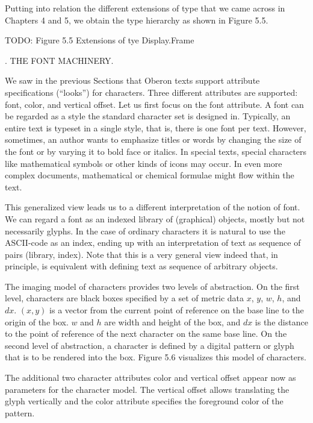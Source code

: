 Putting into relation the different extensions of type  that we came across in Chapters 4 and 5, we obtain the type hierarchy as shown in Figure 5.5.

TODO: Figure 5.5 Extensions of tye Display.Frame

. THE FONT MACHINERY.

We saw in the previous Sections that Oberon texts support attribute specifications (``looks'') for characters. Three different attributes are supported: font, color, and vertical offset. Let us first focus on the font attribute. A font can be regarded as a style the standard character set is designed in. Typically, an entire text is typeset in a single style, that is, there is one font per text. However, sometimes, an author wants to emphasize titles or words by changing the size of the font or by varying it to bold face or italics. In special texts, special characters like mathematical symbols or other kinds of icons may occur. In even more complex documents, mathematical or chemical formulae might flow within the text.

This generalized view leads us to a different interpretation of the notion of font. We can regard a font as an indexed library of (graphical) objects, mostly but not necessarily glyphs. In the case of ordinary characters it is natural to use the ASCII-code as an index, ending up with an interpretation of text as sequence of pairs (library, index). Note that this is a very general view indeed that, in principle, is equivalent with defining text as sequence of arbitrary objects.

The imaging model of characters provides two levels of abstraction. On the first level, characters are black boxes specified by a set of metric data $x$, $y$, $w$, $h$, and $dx$. $(x, y)$ is a vector from the current point of reference on the base line to the origin of the box. $w$ and $h$ are width and height of the box, and $dx$ is the distance to the point of reference of the next character on the same base line. On the second level of abstraction, a character is defined by a digital pattern or glyph that is to be rendered into the box. Figure 5.6 visualizes this model of characters.

The additional two character attributes color and vertical offset appear now as parameters for the character model. The vertical offset allows translating the glyph vertically and the color attribute specifies the foreground color of the pattern.

